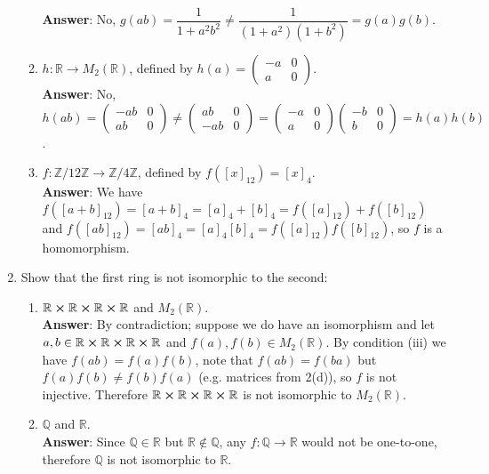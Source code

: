 \documentclass{article}
\begin{document}
\begin{enumerate}
\begin{enumerate}
                        \textbf{Answer}: No, $g(ab)=\dfrac{1}{1+a^2b^2}\neq\dfrac{1}{(1+a^2)(1+b^2)}=g(a)g(b)$.
                  \item $h:\mathbb{R}\rightarrow M_2(\mathbb{R})$, defined by $h(a)=\begin{pmatrix}-a&0\\a&0\end{pmatrix}$.\\
                        \textbf{Answer}: No, $h(ab)=\begin{pmatrix}-ab&0\\ab&0\end{pmatrix}\neq\begin{pmatrix}ab&0\\-ab&0\end{pmatrix}=\begin{pmatrix}-a&0\\a&0\end{pmatrix}\begin{pmatrix}-b&0\\b&0\end{pmatrix}=h(a)h(b)$.
                  \item $f:\mathbb{Z}/12\mathbb{Z}\rightarrow\mathbb{Z}/4\mathbb{Z}$, defined by $f([x]_{12})=[x]_4$.\\
                        \textbf{Answer}: We have $f([a+b]_{12})=[a+b]_4=[a]_4+[b]_4=f([a]_{12})+f([b]_{12})$ and $f([ab]_{12})=[ab]_4=[a]_4[b]_4=f([a]_{12})f([b]_{12})$, so $f$ is a homomorphism.
            \end{enumerate}
      \item Show that the first ring is not isomorphic to the second:
            \begin{enumerate}
                  \item $\mathbb{R}\cross\mathbb{R}\cross\mathbb{R}\cross\mathbb{R}$ and $M_2(\mathbb{R})$.\\
                        \textbf{Answer}: By contradiction; suppose we do have an isomorphism and let $a,b\in\mathbb{R}\cross\mathbb{R}\cross\mathbb{R}\cross\mathbb{R}$ and $f(a),f(b)\in M_2(\mathbb{R})$. By condition (iii) we have $f(ab)=f(a)f(b)$, note that $f(ab)=f(ba)$ but $f(a)f(b)\neq f(b)f(a)$ (e.g. matrices from 2(d)), so $f$ is not injective. Therefore $\mathbb{R}\cross\mathbb{R}\cross\mathbb{R}\cross\mathbb{R}$ is not isomorphic to $M_2(\mathbb{R})$.
                  \item $\mathbb{Q}$ and $\mathbb{R}$.\\
                        \textbf{Answer}: Since $\mathbb{Q}\in\mathbb{R}$ but $\mathbb{R}\notin\mathbb{Q}$, any $f:\mathbb{Q}\rightarrow\mathbb{R}$ would not be one-to-one, therefore $\mathbb{Q}$ is not isomorphic to $\mathbb{R}$.

\end{enumerate}
\end{enumerate}
\end{document}
